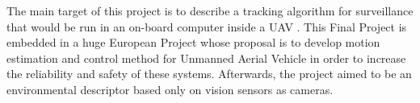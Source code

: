 

The main target of this project is to describe a tracking algorithm for surveillance that would be run in an on-board computer inside a UAV \cite{Image_processing_UAV}.  This Final Project is embedded in a huge European Project whose proposal is to develop motion estimation and control method for Unmanned Aerial Vehicle in order to increase the reliability and safety of these systems. Afterwards, the project aimed to be an environmental descriptor based only on vision sensors as cameras. \\


 
